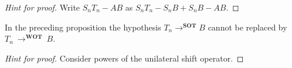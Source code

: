 \begin{proof}[\emph{Hint for proof}] Write $S_nT_n - AB$ as $S_nT_n - S_nB + S_nB - AB$.  \ns
\end{proof}

\begin{exam} In the preceding proposition the hypothesis $T_n \to^{\textbf{SOT}} B$ cannot
be replaced by $T_n~\to^{\textbf{WOT}}~B$.
\end{exam}

\begin{proof}[\emph{Hint for proof}] Consider powers of the unilateral shift operator.  \ns
\end{proof}







\endinput

